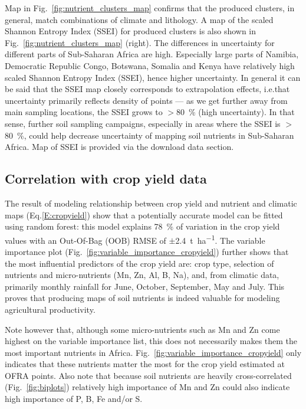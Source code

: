 \begin{linenumbers}
Map in Fig.\@~\ref{fig:nutrient_clusters_map} confirms that the produced clusters, in general, match combinations of climate and lithology. A map of the scaled Shannon Entropy Index (SSEI) for produced clusters is also shown in Fig.\@~\ref{fig:nutrient_clusters_map} (right). The differences in uncertainty for different parts of Sub-Saharan Africa are high. Especially large parts of Namibia, Democratic Republic Congo, Botswana, Somalia and Kenya have relatively high scaled Shannon Entropy Index (SSEI), hence higher uncertainty. In general it can be said that the SSEI map closely corresponds to extrapolation effects, i.e.\@ that uncertainty primarily reflects density of points --- as we get further away from main sampling locations, the SSEI grows to $>$\SI{80}{\percent} (high uncertainty). In that sense, further soil sampling campaigns, especially in areas where the SSEI is $>$\SI{80}{\percent}, could help decrease uncertainty of mapping soil nutrients in Sub-Saharan Africa. Map of SSEI is provided via the download data section.\par

\subsection{Correlation with crop yield data}

The result of modeling relationship between crop yield and nutrient and climatic maps (Eq.\ref{E:cropyield}) show that a potentially accurate model can be fitted using random forest: this model explains \SI{78}{\percent} of variation in the crop yield values with an Out-Of-Bag (OOB) RMSE of $\pm$\SI{2.4}{\tonne\per\hectare}. The variable importance plot (Fig.\@~\ref{fig:variable_importance_cropyield}) further shows that the most influential predictors of the crop yield are: crop type, selection of nutrients and micro-nutrients (Mn, Zn, Al, B, Na), and, from climatic data, primarily monthly rainfall for June, October, September, May and July. This proves that producing maps of soil nutrients is indeed valuable for modeling agricultural productivity.\par

Note however that, although some micro-nutrients such as Mn and Zn come highest on the variable importance list, this does not necessarily makes them the most important nutrients in Africa. Fig.\@~\ref{fig:variable_importance_cropyield} only indicates that these nutrients matter the most for the crop yield estimated at OFRA points. Also note that because soil nutrients are heavily cross-correlated (Fig.\@~\ref{fig:biplots}) relatively high importance of Mn and Zn could also indicate high importance of P, B, Fe and/or S. \par


\end{linenumbers}
